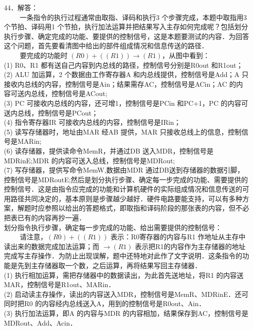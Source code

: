 44．解答： \\
$\qquad$ 一条指令的执行过程通常由取指、译码和执行3 个步骤完成，本题中取指用3 个节拍、译码用1 个节拍，执行加法运算并把结果写入主存如何完成呢？包括划分执行步骤、确定完成的功能、要提供的控制信号，这是本题要测试的内容．为回答这个问题，首先要看清图中给出的部件组成情况和信息传送的路径． \\
$\qquad$ 要完成的功能时 $(R0)+((R1)) \rightarrow (R1)$，从图中看到： \\
(1) R0、R1 都有送自己内容到内总线的路径，控制信号分别是R0out 和R1out； \\
(2) ALU 加运算，2 个数据由工作寄存器A 和内总线提供，控制信号是Add；A 只接收内总线的内容，控制信号是Ain；结果需存AC，控制信号是ACin；AC 的内容可送内总线，控制信号是ACout; \\
(3) PC 可接收内总线的内容，还可增1，控制信号是PCin 和PC+1，PC 的内容可送内总线，控制信号是PCout； \\
(4) 指令寄存器IR 可接收内总线的内容，控制信号是IRin； \\
(5) 读写存储器时，地址由MAR 经AB 提供，MAR 只接收总线上的信息，控制信号是MARin; \\
(6) 读存储器，提供读命令MemR，并通过DB 送入MDR，控制信号是MDRinE;MDR 的内容可送入总线，控制信号是MDRout; \\
(7) 写存储器，提供写命令MemW,数据由MDR 通过DB送到存储器的数据引脚，控制信号是MDRoutE;然后是划分执行步骤、确定每一步完成的功能、需要提供的控制信号．这是由指令应完成的功能和计算机硬件的实际组成情况和信息传送的可用路径共同决定的，基本原则是步骤越少越好．硬件电路要能支持，可以有多种方案，解题时应参照以给出的答题格式，即取指和译码阶段的那张表的内容，但不必把表已有的内容再抄一遍． \\
划分指令执行步骤，确定每一步完成的功能、给出需要提供的控制信号： \\
$\qquad$ 请注意，$(R0)+((R1))$ 表示：R0寄存器的内容与R1 作地址从主存中读出来的数据完成加法运算；而 $\rightarrow(R1)$ 表示把R1的内容作为主存储器的地址完成写主存操作．为防止出现误解，题中还特地对此作了文字说明．这条指令的功能是先到主存储器取一个数，之后运算，再将结果写回主存储器． \\
(1) 执行相加运算，需把存储器中的数据读出，为此首先送地址，将R1 的内容送MAR，控制信号是R1out、MARin． \\
(2) 启动读主存操作，读出的内容送入MDR，控制信号是MemR、MDRinE．还可同时把R0 的内容经内总线送入A，用到的控制信号是R0out、Ain． \\
(3) 执行加法运算，即A 的内容与MDR 的内容相加，结果保存到AC，控制信号是MDRout、Add、Acin． \\
